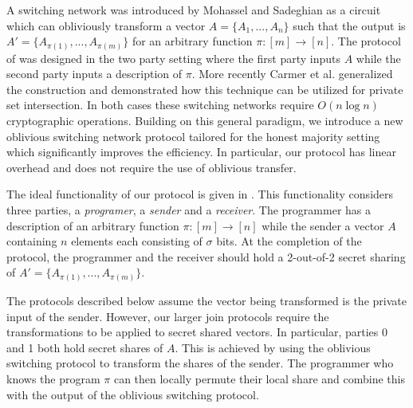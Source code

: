 A switching network was introduced by Mohassel and Sadeghian\cite{MS13} as a circuit which can obliviously transform a vector $A=\{A_1,...,A_n\}$ such that the output is $A'=\{A_{\pi(1)}, ..., A_{\pi(m)}\}$ for an arbitrary function $\pi : [m]\rightarrow[n]$. The protocol of \cite{MS13} was designed in the two party setting where the first party inputs $A$ while the second party inputs a description of $\pi$. More recently Carmer et al. \cite{CMRS18} generalized the construction and demonstrated how this technique can be utilized for private set intersection. In both cases these switching networks require  $O(n\log n)$ cryptographic operations. Building on this general paradigm, we introduce a new oblivious switching network protocol tailored for the honest majority setting which significantly improves the efficiency. In particular, our protocol has linear overhead and does not require the use of oblivious transfer. 

The ideal functionality of our protocol is given in . This functionality considers three parties, a \emph{programer}, a \emph{sender} and a \emph{receiver}. The programmer has a description of an arbitrary function  $\pi:[m]\rightarrow[n]$ while the sender a vector $A$ containing $n$ elements each consisting of $\sigma$ bits. At the completion of the protocol, the programmer and the receiver should hold a 2-out-of-2 secret sharing of $A'=\{A_{\pi(1)}, ..., A_{\pi(m)}\}$.


The protocols described below assume the vector being transformed is the private input of the sender. However, our larger join protocols require the transformations to be applied to secret shared vectors. In particular, parties 0 and 1 both hold secret shares of $A$. This is achieved by using the oblivious switching protocol to transform the shares of the sender. The programmer who knows the program $\pi$ can then locally permute their local share and combine this with the output of the oblivious switching protocol.


